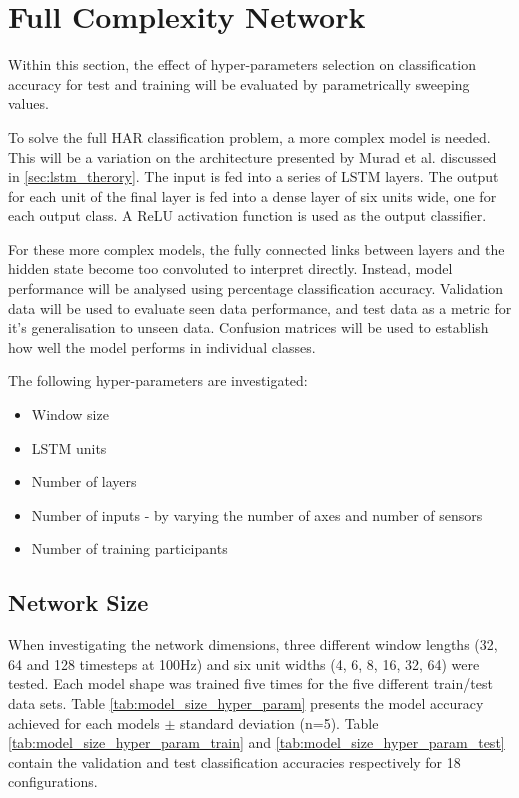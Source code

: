 \documentclass[sensors,article,submit,moreauthors,pdftex]{Definitions/mdpi}
\begin{document}
\section{Full Complexity Network}
\label{sec:full_complexity}
 Within this section, the effect of hyper-parameters selection on classification accuracy for test and training will be evaluated by parametrically sweeping values.

To solve the full HAR classification problem, a more complex model is needed. This will be a variation on the architecture presented by Murad et al. discussed in \ref{sec:lstm_therory}. The input is fed into a series of LSTM layers. The output for each unit of the final layer is fed into a dense layer of six units wide, one for each output class. A ReLU activation function is used as the output classifier.

For these more complex models, the fully connected links between layers and the hidden state become too convoluted to interpret directly. Instead, model performance will be analysed using percentage classification accuracy. Validation data will be used to evaluate seen data performance, and test data as a metric for it's generalisation to unseen data. Confusion matrices will be used to establish how well the model performs in individual classes.

The following hyper-parameters are investigated:
\begin{itemize}
    \item Window size
    \item LSTM units
    \item Number of layers
    \item Number of inputs - by varying the number of axes and number of sensors
    \item Number of training participants 
\end{itemize}

\subsection{Network Size}
When investigating the network dimensions, three different window lengths (32, 64 and 128 timesteps at 100Hz) and six unit widths (4, 6, 8, 16, 32, 64) were tested. Each model shape was trained five times for the five different train/test data sets. Table \ref{tab:model_size_hyper_param} presents the model accuracy achieved for each models $\pm$ standard deviation (n=5). Table \ref{tab:model_size_hyper_param_train} and \ref{tab:model_size_hyper_param_test} contain the validation and test classification accuracies respectively for 18 configurations.
\end{document}
